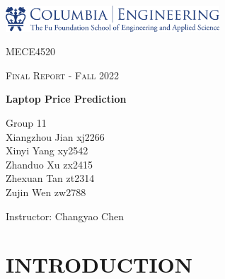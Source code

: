 \documentclass{scrartcl}
\begin{document}
\begin{titlepage}
	\centering
	\includegraphics[width=0.6\textwidth]{Graphics/CU E LOGO.png}\par
	\vspace{1cm}
	{\scshape\LARGE MECE4520 \par}      
 
	\vspace{1cm}
	{\scshape\Large Final Report - Fall 2022\par}
	\vfill
	
	{\huge\bfseries Laptop Price Prediction\par}
	\vfill
	
	{\Large Group 11 \\Xiangzhou Jian xj2266\\Xinyi Yang xy2542\\Zhanduo Xu zx2415\\Zhexuan Tan zt2314\\Zujin Wen zw2788\\}\par
	\vspace{1.5cm}

	\vfill
	{\Large Instructor: Changyao Chen}\par



	\vfill
\end{titlepage}


\newpage



\doublespacing
\tableofcontents
\singlespacing

\newpage

\doublespacing


\section{INTRODUCTION}
\end{document}
